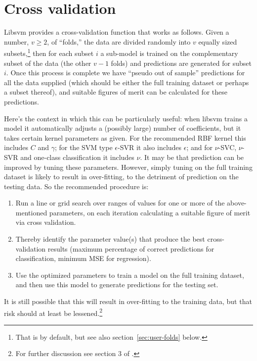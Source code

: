 \documentclass{article}
\begin{document}
\section{Cross validation}
\label{sec:xvalid}

\textsf{Libsvm} provides a cross-validation function that works as
follows. Given a number, $v \geq 2$, of ``folds,'' the data are
divided randomly into $v$ equally sized subsets,\footnote{That is by
  default, but see also section~\ref{sec:user-folds} below.} then
for each subset $i$ a sub-model is trained on the complementary subset
of the data (the other $v-1$ folds) and predictions are generated for
subset $i$. Once this process is complete we have ``pseudo out of
sample'' predictions for all the data supplied (which should be either
the full training dataset or perhaps a subset thereof), and suitable
figures of merit can be calculated for these predictions.

Here's the context in which this can be particularly useful: when
\textsf{libsvm} trains a model it automatically adjusts a (possibly
large) number of coefficients, but it takes certain kernel parameters
as given. For the recommended RBF kernel this includes $C$ and
$\gamma$; for the SVM type $\epsilon$-SVR it also includes $\epsilon$;
and for $\nu$-SVC, $\nu$-SVR and one-class classification it includes
$\nu$. It may be that prediction can be improved by tuning these
parameters. However, simply tuning on the full training dataset is
likely to result in over-fitting, to the detriment of prediction on
the testing data. So the recommended procedure is:
\begin{enumerate}
\item Run a line or grid search over ranges of values for one or more
  of the above-mentioned parameters, on each iteration calculating a
  suitable figure of merit via cross validation.
\item Thereby identify the parameter value(s) that produce the
  best cross-validation results (maximum percentage of correct
  predictions for classification, minimum MSE for regression).
\item Use the optimized parameters to train a model on the full
  training dataset, and then use this model to generate predictions
  for the testing set.
\end{enumerate}

It is still possible that this will result in over-fitting to the
training data, but that risk should at least be lessened.\footnote{For
  further discussion see section 3 of \cite{HCL16}.}
\end{document}

